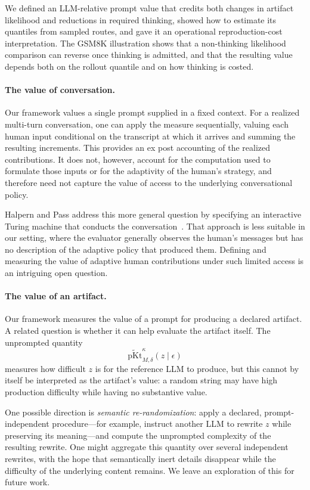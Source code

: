 \documentclass[letterpaper]{article} %
\theoremstyle{definition}
\theoremstyle{remark}
\newcommand{\eps}{\epsilon}
\newcommand{\pKt}{\mathrm{pKt}}
\newcommand{\pKtt}{\widetilde{\pKt}}
\begin{document}
We defined an LLM-relative prompt value that credits both changes in artifact
likelihood and reductions in required thinking, showed how to estimate its
quantiles from sampled routes, and gave it an operational reproduction-cost
interpretation. The GSM8K illustration shows that a non-thinking likelihood
comparison can reverse once thinking is admitted, and that the resulting value
depends both on the rollout quantile and on how thinking is costed.

\paragraph{The value of conversation.}
Our framework values a single prompt supplied in a fixed context. For a
realized multi-turn conversation, one can apply the measure sequentially,
valuing each human input conditional on the transcript at which it arrives and
summing the resulting increments. This provides an ex post accounting of the
realized contributions. It does not, however, account for the computation used
to formulate those inputs or for the adaptivity of the human's strategy, and
therefore need not capture the value of access to the underlying conversational
policy.

Halpern and Pass address this more general question by specifying an interactive
Turing machine that conducts the conversation~\cite{HP11}. That approach is
less suitable in our setting, where the evaluator generally observes the
human's messages but has no description of the adaptive policy that produced
them. Defining and measuring the value of adaptive human contributions under
such limited access is an intriguing open question.

\paragraph{The value of an artifact.}
Our framework measures the value of a prompt for producing a declared artifact.
A related question is whether it can help evaluate the artifact itself. The
unprompted quantity
\[
\pKtt^\kappa_{M,\delta}(z\mid\eps)
\]
measures how difficult \(z\) is for the reference LLM to produce, but this
cannot by itself be interpreted as the artifact's value: a random string may
have high production difficulty while having no substantive value.

One possible direction is \emph{semantic re-randomization}: apply a declared,
prompt-independent procedure---for example, instruct another LLM to rewrite
\(z\) while preserving its meaning---and compute the unprompted complexity of
the resulting rewrite. One might aggregate this quantity over several
independent rewrites, with the hope that semantically inert details disappear
while the difficulty of the underlying content remains. We leave an exploration of this for future work.
\end{document}
